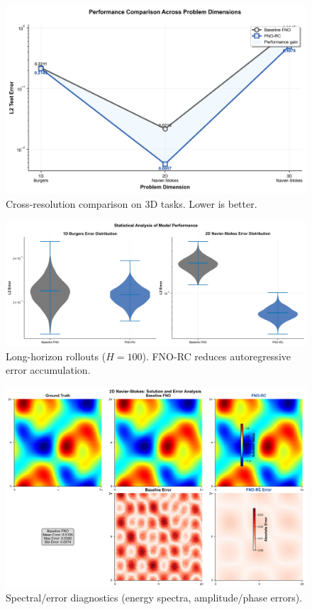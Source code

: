 \documentclass[11pt,twocolumn]{article}
\begin{document}
\begin{figure}[t]
  \centering
  \includegraphics[width=.95\linewidth]{figures/performance_comparison.png}
  \caption{Cross-resolution comparison on 3D tasks. Lower is better.}
  \label{fig:crossres}
\end{figure}

\begin{figure}[t]
  \centering
  \includegraphics[width=.95\linewidth]{figures/long_term_prediction.png}
  \caption{Long-horizon rollouts ($H{=}100$). FNO-RC reduces autoregressive error accumulation.}
  \label{fig:rollout}
\end{figure}

\begin{figure}[t]
  \centering
  \includegraphics[width=.95\linewidth]{figures/error_analysis.png}
  \caption{Spectral/error diagnostics (energy spectra, amplitude/phase errors).}
  \label{fig:spectrum}
\end{figure}
\end{document}
